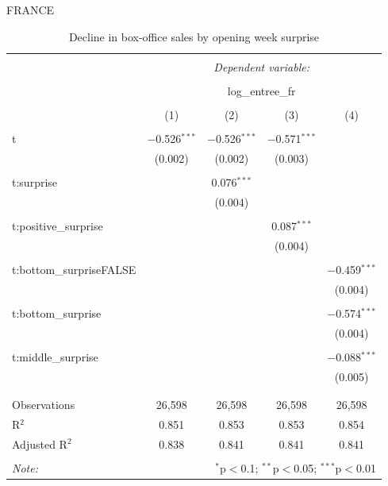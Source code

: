 FRANCE

\begin{table}[!htbp] \centering 
	\caption{Decline in box-office sales by opening week surprise} 
	\label{} 
	\begin{tabular}{@{\extracolsep{5pt}}lcccc} 
		\\[-1.8ex]\hline 
		\hline \\[-1.8ex] 
		& \multicolumn{4}{c}{\textit{Dependent variable:}} \\ 
		\cline{2-5} 
		\\[-1.8ex] & \multicolumn{4}{c}{log\_entree\_fr} \\ 
		\\[-1.8ex] & (1) & (2) & (3) & (4)\\ 
		\hline \\[-1.8ex] 
		t & $-$0.526$^{***}$ & $-$0.526$^{***}$ & $-$0.571$^{***}$ &  \\ 
		& (0.002) & (0.002) & (0.003) &  \\ 
		& & & & \\ 
		t:surprise &  & 0.076$^{***}$ &  &  \\ 
		&  & (0.004) &  &  \\ 
		& & & & \\ 
		t:positive\_surprise &  &  & 0.087$^{***}$ &  \\ 
		&  &  & (0.004) &  \\ 
		& & & & \\ 
		t:bottom\_surpriseFALSE &  &  &  & $-$0.459$^{***}$ \\ 
		&  &  &  & (0.004) \\ 
		& & & & \\ 
		t:bottom\_surprise &  &  &  & $-$0.574$^{***}$ \\ 
		&  &  &  & (0.004) \\ 
		& & & & \\ 
		t:middle\_surprise &  &  &  & $-$0.088$^{***}$ \\ 
		&  &  &  & (0.005) \\ 
		& & & & \\ 
		\hline \\[-1.8ex] 
		Observations & 26,598 & 26,598 & 26,598 & 26,598 \\ 
		R$^{2}$ & 0.851 & 0.853 & 0.853 & 0.854 \\ 
		Adjusted R$^{2}$ & 0.838 & 0.841 & 0.841 & 0.841 \\ 
		\hline 
		\hline \\[-1.8ex] 
		\textit{Note:}  & \multicolumn{4}{r}{$^{*}$p$<$0.1; $^{**}$p$<$0.05; $^{***}$p$<$0.01} \\ 
	\end{tabular} 
\end{table} 

